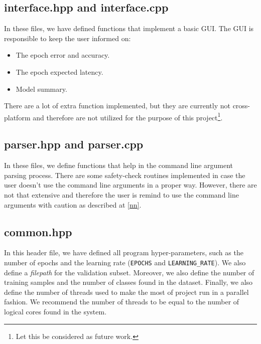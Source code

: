 \subsection{interface.hpp and interface.cpp}

In these files, we have defined functions that implement a basic GUI. The GUI is responsible to keep the user informed on:
\begin{itemize}
\item The epoch error and accuracy.
\item The epoch expected latency.
\item Model summary.
\end{itemize}

There are a lot of extra function implemented, but they are currently not cross-platform and therefore are not utilized for the purpose of this project\footnote{Let this be considered as future work.}.

\subsection{parser.hpp and parser.cpp}

In these files, we define functions that help in the command line argument parsing process. There are some safety-check routines implemented in case the user doesn't use the command line arguments in a proper way. However, there are not that extensive and therefore the user is remind to use the command line arguments with caution as described at \ref{nn}.

\subsection{common.hpp}

In this header file, we have defined all program hyper-parameters, such as the number of epochs and the learning rate (\verb|EPOCHS| and \verb|LEARNING_RATE|). We also define a \textit{filepath} for the validation subset. Moreover, we also define the number of training samples and the number of classes found in the dataset. Finally, we also define the number of threads used to make the most of project run in a parallel fashion. We recommend the number of threads to be equal to the number of logical cores found in the system.
